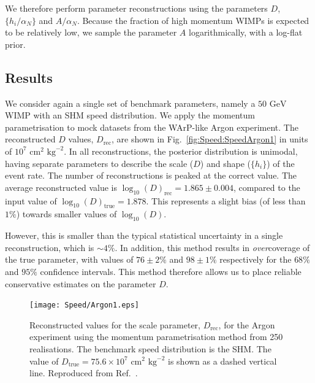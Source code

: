 We therefore perform parameter reconstructions using the parameters \(D\), \(\{h_i/\alpha_N\}\) and \(A/\alpha_N\). Because the fraction of high momentum WIMPs is expected to be relatively low, we sample the parameter \(A\) logarithmically, with a log-flat prior.

\subsection{Results}

We consider again a single set of benchmark parameters, namely a \(50 \textrm{ GeV}\) WIMP with an SHM speed distribution. We apply the momentum parametrisation to mock datasets from the WArP-like Argon experiment. The reconstructed \(D\) values, \(D_\textrm{rec}\),  are shown in Fig.\ \ref{fig:Speed:SpeedArgon1} in units of \(10^7 \textrm{ cm}^2 \textrm{ kg}^{-2}\). In all reconstructions, the posterior distribution is unimodal, having separate parameters to describe the scale (\(D\)) and shape (\(\{h_i\}\)) of the event rate. The number of reconstructions is peaked at the correct value. The average reconstructed value is \(\log_{10}(D)_\textrm{rec} = 1.865 \pm 0.004\), compared to the input value of \(\log_{10}(D)_\textrm{true} = 1.878\). This represents a slight bias (of less than \(1\%\)) towards smaller values of \(\log_{10}(D)\).

However, this is smaller than the typical statistical uncertainty in a single reconstruction, which is \(\sim 4\%\). In addition, this method results in \textit{over}coverage of the true parameter, with values of \(76 \pm 2 \%\) and \(98 \pm 1\%\) respectively for the \(68\%\) and \(95\%\) confidence intervals. This method therefore allows us to place reliable conservative estimates on the parameter \(D\).

\begin{figure}[t]
\centering
  \texttt{[image: Speed/Argon1.eps]}
  \caption[Distribution of the reconstructed scale parameter, $D_\textrm{rec}$, for the Argon experiment using the momentum parametrisation]{Reconstructed values for the scale parameter, \(D_\textrm{rec}\), for the Argon experiment using the momentum parametrisation method from 250 realisations. The benchmark speed distribution is the SHM. The value of \(D_\textrm{true} = 75.6 \times 10^7 \textrm{ cm}^2 \textrm{ kg}^{-2}\) is shown as a dashed vertical line. Reproduced from Ref.~\cite{Kavanagh:2012}.}
   \label{fig:Speed:Argon1}
\end{figure}

